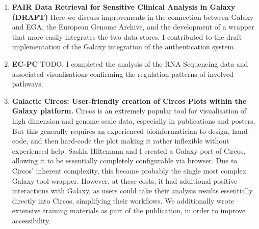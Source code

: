\begin{enumerate}[label=\ref{chapter:cancer}.\arabic*]
\itemsep-0.5em
\setcounter{enumi}{-1}
\item \textbf{FAIR Data Retrieval for Sensitive Clinical Analysis in Galaxy (DRAFT)} Here we discuss improvements in the connection between Galaxy and EGA, the European Genome Archive, and the development of a wrapper that more easily integrates the two data stores. I contributed to the draft implementation of the Galaxy integration of the authentication system.


\item \textbf{EC-PC} TODO. I completed the analysis of the RNA Sequencing data and associated visualisations confirming the regulation patterns of involved pathways.

\item \textbf{Galactic Circos: User-friendly creation of Circos Plots within the Galaxy platform.} Circos is an extremely popular tool for visualisation of high dimension and genome scale data, especially in publications and posters. But this generally requires an experienced bioinformatician to design, hand-code, and then hard-code the plot making it rather inflexible without experienced help. Saskia Hiltemann and I created a Galaxy port of Circos, allowing it to be essentially completely configurable via browser. Due to Circos' inherent complexity, this became probably the single most complex Galaxy tool wrapper. However, at these costs, it had additional positive interactions with Galaxy, as users could take their analysis results essentially directly into Circos, simplifying their workflows. We additionally wrote extensive training materials as part of the publication, in order to improve accessibility.
\end{enumerate}

